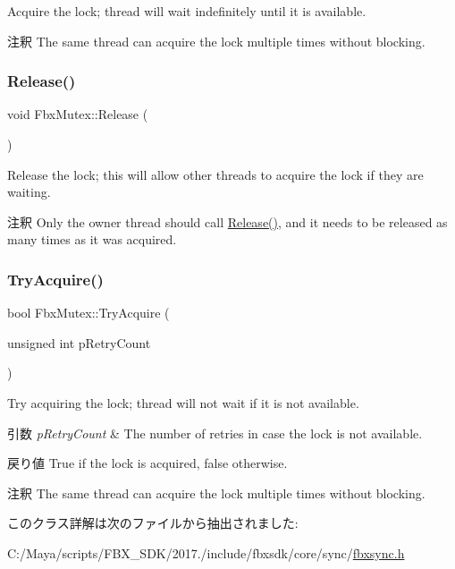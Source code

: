 Acquire the lock; thread will wait indefinitely until it is available. \begin{DoxyRemark}{注釈}
The same thread can acquire the lock multiple times without blocking. 
\end{DoxyRemark}
\mbox{\label{class_fbx_mutex_af64f050aba0c86a19c75c8fc236325d1}} 
\subsubsection{\texorpdfstring{Release()}{Release()}}
{\footnotesize\ttfamily void Fbx\+Mutex\+::\+Release (\begin{DoxyParamCaption}{ }\end{DoxyParamCaption})}

Release the lock; this will allow other threads to acquire the lock if they are waiting. \begin{DoxyRemark}{注釈}
Only the owner thread should call \hyperlink{class_fbx_mutex_af64f050aba0c86a19c75c8fc236325d1}{Release()}, and it needs to be released as many times as it was acquired. 
\end{DoxyRemark}
\mbox{\label{class_fbx_mutex_ace271bd592e917dffdc850b74482d52f}} 
\subsubsection{\texorpdfstring{Try\+Acquire()}{TryAcquire()}}
{\footnotesize\ttfamily bool Fbx\+Mutex\+::\+Try\+Acquire (\begin{DoxyParamCaption}\item[{unsigned int}]{p\+Retry\+Count }\end{DoxyParamCaption})}

Try acquiring the lock; thread will not wait if it is not available. 
\begin{DoxyParams}{引数}
{\em p\+Retry\+Count} & The number of retries in case the lock is not available. \\
\hline
\end{DoxyParams}
\begin{DoxyReturn}{戻り値}
True if the lock is acquired, false otherwise. 
\end{DoxyReturn}
\begin{DoxyRemark}{注釈}
The same thread can acquire the lock multiple times without blocking. 
\end{DoxyRemark}


このクラス詳解は次のファイルから抽出されました\+:\begin{DoxyCompactItemize}
\item 
C\+:/\+Maya/scripts/\+F\+B\+X\+\_\+\+S\+D\+K/2017./include/fbxsdk/core/sync/\hyperlink{fbxsync_8h}{fbxsync.\+h}\end{DoxyCompactItemize}
